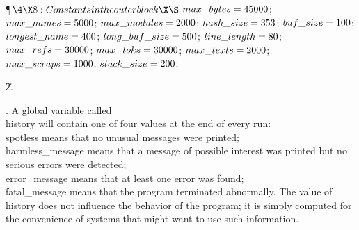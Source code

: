 \Y\P$\4\X8:Constants in the outer block\X\S$\6
$\\{max\_bytes}=45000$;\6
$\\{max\_names}=5000$;\6
$\\{max\_modules}=2000$;\6
$\\{hash\_size}=353$;\6
$\\{buf\_size}=100$;\6
$\\{longest\_name}=400$;\6
$\\{long\_buf\_size}=500$;\6
$\\{line\_length}=80$;\6
$\\{max\_refs}=30000$;\6
$\\{max\_toks}=30000$;\6
$\\{max\_texts}=2000$;\6
$\\{max\_scraps}=1000$;\6
$\\{stack\_size}=200$;\par
\U2.\fi

. A global variable called \\{history} will contain one of four values
at the end of every run: \\{spotless} means that no unusual messages were
printed; \\{harmless\_message} means that a message of possible interest
was printed but no serious errors were detected; \\{error\_message} means that
at least one error was found; \\{fatal\_message} means that the program
terminated abnormally. The value of \\{history} does not influence the
behavior of the program; it is simply computed for the convenience
of systems that might want to use such information.

